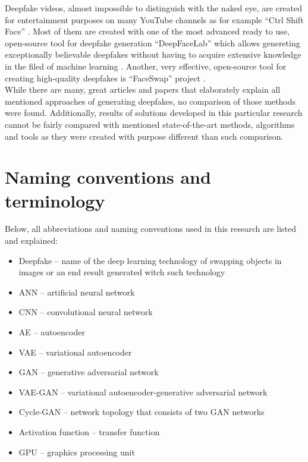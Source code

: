 Deepfake videos, almost impossible to distinguish with the naked eye, are created for entertainment purposes on many YouTube channels as for example ``Ctrl Shift Face'' \cite{ctrl_shift_face_bib}. Most of them are created with one of the most advanced ready to use, open-source tool for deepfake generation ``DeepFaceLab'' which allows genereting exceptionally believable deepfakes without having to acquire extensive knowledge in the filed of machine learning \cite{DeepFaceLab_bib}. Another, very effective, open-source tool for creating high-quality deepfakes is ``FaceSwap'' project \cite{faceswap_bib}.\\

While there are many, great articles and papers that elaborately explain all mentioned approaches of generating deepfakes, no comparison of those methods were found. Additionally, results of solutions developed in this particular research cannot be fairly compared with mentioned state-of-the-art methods, algorithms and tools as they were created with purpose different than such comparison.

\section{Naming conventions and terminology}
Below, all abbreviations and naming conventions used in this research are listed and explained:

\begin{itemize}
\item Deepfake -- name of the deep learning technology of swapping objects in images or an end result generated witch such technology
\item ANN -- artificial neural network
\item CNN -- convolutional neural network
\item AE -- autoencoder 
\item VAE -- variational autoencoder
\item GAN -- generative adversarial network
\item VAE-GAN -- variational autoencoder-generative adversarial network
\item Cycle-GAN -- network topology that consists of two GAN networks
\item Activation function -- transfer function
\item GPU -- graphics processing unit
\end{itemize}